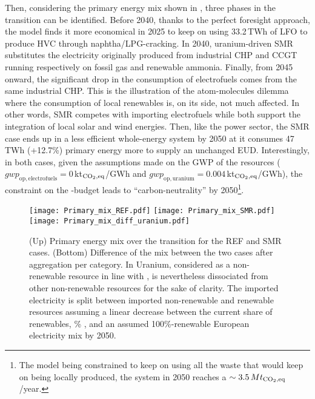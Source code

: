 Then, considering the primary energy mix shown in , three phases in the transition can be identified. Before 2040, thanks to the perfect foresight approach, the model finds it more economical in 2025 to keep on using 33.2\,TWh of \gls{LFO} to produce \gls{HVC} through naphtha/LPG-cracking. In 2040, uranium-driven \gls{SMR} substitutes the electricity originally produced from industrial \gls{CHP} and \gls{CCGT} running respectively on fossil gas and renewable ammonia. Finally, from 2045 onward, the significant drop in the consumption of electrofuels comes from the same industrial \gls{CHP}. This is the illustration of the atom-molecules dilemma where the consumption of local renewables is, on its side, not much affected. In other words, \gls{SMR} competes with importing electrofuels while both support the integration of local solar and wind energies. Then, like the power sector, the SMR case ends up in a less efficient whole-energy system by 2050 at it consumes 47\,TWh (+12.7\%) primary energy more to supply an unchanged \gls{EUD}. Interestingly, in both cases, given the assumptions made on the \gls{GWP} of the resources (\ie $\mathit{gwp}_{\mathrm{op,electrofuels}}=0$\,kt$_{\ce{CO2},\text{eq}}$/GWh and $\mathit{gwp}_{\mathrm{op,uranium}}=0.004$\,kt$_{\ce{CO2},\text{eq}}$/GWh), the constraint on the -budget leads to ``carbon-neutrality'' by 2050\footnote{The model being constrained to keep on using all the waste that would keep on being locally produced, the system in 2050 reaches a $\sim 3.5\,Mt_{\ce{CO2},\text{eq}}$/year.}.

\begin{figure}[htbp!]
\centering
\texttt{[image: Primary\_mix\_REF.pdf]}
\texttt{[image: Primary\_mix\_SMR.pdf]}
\texttt{[image: Primary\_mix\_diff\_uranium.pdf]}
\caption{(Up) Primary energy mix over the transition for the REF and SMR cases. (Bottom) Difference of the mix between the two cases after aggregation per category. In Uranium, considered as a non-renewable resource in line with \citet{rixhon2021terminology}, is nevertheless dissociated from other non-renewable resources for the sake of clarity. The imported electricity is split between imported non-renewable and renewable resources assuming a linear decrease between the current share of renewables, \% \cite{eurostat_share_re_elec}, and an assumed 100\%-renewable European electricity mix by 2050.}
\label{fig:results_deter_energy_mix}
\end{figure}

